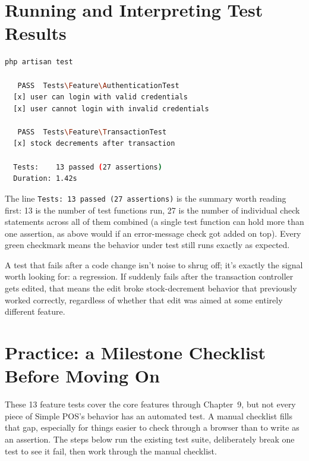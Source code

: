 \section{Running and Interpreting Test Results}
\label{sec:pengujian-aplikasi-2}

\begin{lstlisting}[language=bash]
php artisan test

   PASS  Tests\Feature\AuthenticationTest
  [x] user can login with valid credentials
  [x] user cannot login with invalid credentials

   PASS  Tests\Feature\TransactionTest
  [x] stock decrements after transaction

  Tests:    13 passed (27 assertions)
  Duration: 1.42s
\end{lstlisting}

The line \texttt{Tests: 13 passed (27 assertions)} is the summary worth
reading first: 13 is the number of test functions run, 27 is the number
of individual check statements across all of them combined (a single
test function can hold more than one assertion, as
 above would if an
error-message check got added on top). Every green checkmark means the
behavior under test still runs exactly as expected.

\begin{warningbox}
A test that fails after a code change isn't noise to shrug off; it's
exactly the signal worth looking for: a regression. If
 suddenly fails
after the transaction controller gets edited, that means the edit broke
stock-decrement behavior that previously worked correctly, regardless
of whether that edit was aimed at some entirely different feature.
\end{warningbox}

\section{Practice: a Milestone Checklist Before Moving On}
\label{sec:pengujian-aplikasi-3}

These 13 feature tests cover the core features through Chapter~9, but
not every piece of Simple POS's behavior has an automated test. A
manual checklist fills that gap, especially for things easier to check
through a browser than to write as an assertion. The steps below run
the existing test suite, deliberately break one test to see it fail,
then work through the manual checklist.

